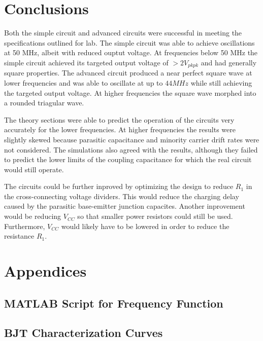 \documentclass[titlepage, letterpaper, 10.5pt]{article}
\begin{document}
\section{Conclusions}

Both the simple circuit and advanced circuits were successful in meeting the specifications outlined for lab.
The simple circuit was able to achieve oscillations at 50 MHz, albeit with reduced ouptut voltage. At frequencies
below 50 MHz the simple circuit achieved its targeted output voltage of $>2 V_{pkpk}$ and had generally square
properties.
The advanced circuit produced a near perfect square wave at lower frequencies and was able to oscillate at up
to $44 MHz$ while still achieving the targeted output voltage. At higher frequencies the square wave morphed
into a rounded triagular wave.

The theory sections were able to predict the operation of the circuits very accurately for the lower frequencies.
At higher frequencies the results were slightly skewed because parasitic capacitance and minority carrier drift
rates were not considered. The simulations also agreed with the results, although they failed to predict the lower
limits of the coupling capacitance for which the real circuit would still operate.

The circuits could be further inproved by optimizing the design to reduce $R_{1}$ in the cross-connecting
voltage dividers. This would reduce the charging delay caused by the parasitic base-emitter junction capacites.
Another inprovement would be reducing $V_{CC}$ so that smaller power resistors could still be used. Furthermore,
$V_{CC}$ would likely have to be lowered in order to reduce the resistance $R_{1}$.

\clearpage
\section{Appendices}
\subsection{MATLAB Script for Frequency Function}
\label{matlab-plotting-script}


\clearpage
\subsection{BJT Characterization Curves}
\label{bjt-appendix}
\end{document}

